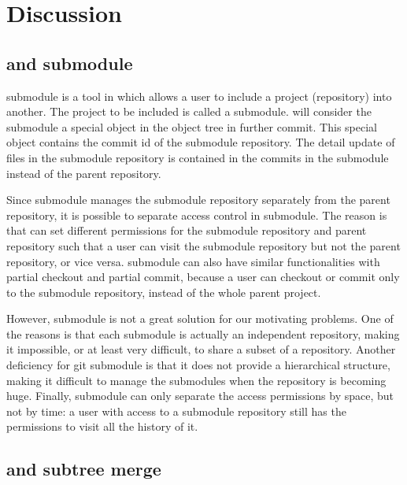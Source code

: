 \section{Discussion}
\label{s:discussion}
\label{s:disc}

\subsection{\Sys and \git submodule}
\Git submodule is a tool in \git which
allows a user to include a project (repository) into another. The project to be included
is called a submodule. \Git will consider the submodule a special object in the
object tree in further commit. This special object contains the commit id of the
submodule repository. The detail update of files in the submodule repository is
contained in the commits in the submodule instead of the parent repository.

Since \git submodule manages the submodule repository separately from the parent repository,
it is possible to separate access control in \git submodule. The reason is that
\git can set different permissions for the submodule repository and parent
repository such that a user can visit the submodule repository but not the parent repository,
or vice versa. \Git submodule can also have similar functionalities with partial
checkout and partial commit, because a user can checkout or commit only to the
submodule repository, instead of the whole parent project.

However, \git submodule is not a great solution for our motivating problems.
One of the reasons is that each submodule is actually an independent \git
repository, making it impossible, or at least very difficult, to share a subset
of a repository. Another deficiency for git submodule is that it does not
provide a hierarchical structure, making it difficult to manage the submodules
when the repository is becoming huge. Finally, \git submodule can only separate the
access permissions by space, but not by time: a user with access to a submodule
repository still has the permissions to visit all the history of it.

\iffalse
\subsection{\Sys and \git access management tools}
\fi

\subsection{\Sys and \git subtree merge}

